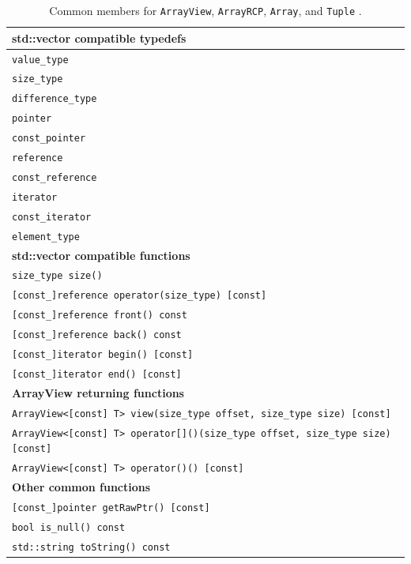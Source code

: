 \documentclass[pdf,ps2pdf,11pt]{SANDreport}
\begin{document}
\begin{table}
{\small\begin{center}
\begin{tabular}{|l|}
\hline
{}\textbf{std::vector compatible typedefs} \\
\hline
{}\texttt{value\_type} \\
{}\texttt{size\_type} \\
{}\texttt{difference\_type} \\
{}\texttt{pointer} \\
{}\texttt{const\_pointer} \\
{}\texttt{reference} \\
{}\texttt{const\_reference} \\
{}\texttt{iterator} \\
{}\texttt{const\_iterator} \\
{}\texttt{element\_type} \\
\hline
{}\textbf{std::vector compatible functions} \\
\hline
{}\texttt{size\_type size()} \\
{}\texttt{[const\_]reference operator{}(size\_type) [const]} \\
{}\texttt{[const\_]reference front() const} \\
{}\texttt{[const\_]reference back() const} \\
{}\texttt{[const\_]iterator begin() [const]} \\
{}\texttt{[const\_]iterator end() [const]} \\
\hline
{}\textbf{ArrayView returning functions} \\
\hline
{}\texttt{ArrayView<[const] T> view(size\_type offset, size\_type size) [const]} \\
{}\texttt{ArrayView<[const] T> operator[]()(size\_type offset, size\_type size) [const]} \\
{}\texttt{ArrayView<[const] T> operator()() [const]} \\
\hline
{}\textbf{Other common functions} \\
\hline
{}\texttt{[const\_]pointer getRawPtr() [const]} \\
{}\texttt{bool is\_null() const} \\
{}\texttt{std::string toString() const} \\
\hline
\end{tabular}
\caption{\label{tbl:common-array-type-members} Common members for
{}\texttt{ArrayView}, {}\texttt{ArrayRCP}, {}\texttt{Array}, and
{}\texttt{Tuple} .}
\end{center}}
\end{table}
\end{document}
